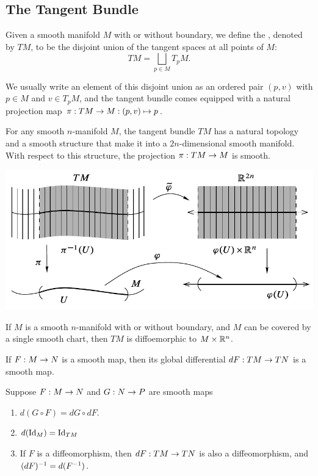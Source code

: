 \subsection{The Tangent Bundle}\nl

\dfn Given a smooth manifold $M$ with or without boundary, we define the , denoted by $TM$, to be the disjoint union of the tangent spaces at all points of $M$:
\[TM = \bigsqcup_{p\in M} T_pM.\]

\nb We usually write an element of this disjoint union as an ordered pair $(p,v)$ with $p\in M$ and $v\in T_pM$, and the tangent bundle comes equipped with a natural projection map $\pi:TM\rightarrow M:(p,v)\mapsto p$.

\setcounter{thm}{17}

\begin{prop}
For any smooth $n$-manifold $M$, the tangent bundle $TM$ has a natural topology and a smooth structure that make it into a $2n$-dimensional smooth manifold. With respect to this structure, the projection $\pi:TM\rightarrow M$ is smooth.
\end{prop}

\begin{center}
    \includegraphics[scale = 0.5]{chapter03/c3f8.png}
\end{center}

\setcounter{thm}{19}

\begin{prop}
If $M$ is a smooth $n$-manifold with or without boundary, and $M$ can be covered by a single smooth chart, then $TM$ is diffoemorphic to $M\times \mathbb{R}^n$.
\end{prop}

\begin{prop}
If $F:M\rightarrow N$ is a smooth map, then its global differential $dF:TM\rightarrow TN$ is a smooth map.
\end{prop}

\begin{cor}
Suppose $F:M\rightarrow N$ and $G:N\rightarrow P$ are smooth maps
\begin{enumerate}
    \item $d(G\circ F) = dG\circ dF$.
    \item $d(\text{Id}_M) = \text{Id}_{TM}$
    \item If $F$ is a diffeomorphism, then $dF:TM\rightarrow TN$ is also a diffeomorphism, and $(dF)^{-1} = d(F^{-1})$.
\end{enumerate}
\end{cor}

